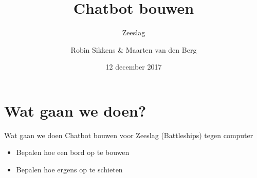 \documentclass{beamer}
\title{Chatbot bouwen}
\subtitle{Zeeslag }
\author{Robin Sikkens \& Maarten van den Berg}
\date{12 december 2017}
\begin{document}
\begin{frame}
	\titlepage
\end{frame}

\section{Wat gaan we doen?}
\begin{frame}{Wat gaan we doen}
	Chatbot bouwen voor Zeeslag (Battleships) tegen computer

	\begin{itemize}
		\item Bepalen hoe een bord op te bouwen
		\item Bepalen hoe ergens op te schieten
	\end{itemize}
\end{frame}
\end{document}
